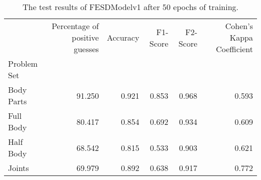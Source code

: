 \begin{table}
      \caption[]{}
      \label{}
          \begin{table}[!htbp]
        \caption[Test Results of FESDModelv1]{The test results of FESDModelv1 after 50 epochs of training.}
        \label{tab:res_v1}
        \begin{tabular}{lrrrrr}
\hline
{} &  Percentage of positive guesses &  Accuracy &  F1-Score &  F2-Score &  Cohen's Kappa Coefficient \\
Problem Set   &                                 &           &           &           &                            \\
\hline
Body Parts &                          91.250 &     0.921 &     0.853 &     0.968 &                      0.593 \\
Full Body  &                          80.417 &     0.854 &     0.692 &     0.934 &                      0.609 \\
Half Body  &                          68.542 &     0.815 &     0.533 &     0.903 &                      0.621 \\
Joints     &                          69.979 &     0.892 &     0.638 &     0.917 &                      0.772 \\
\hline
\end{tabular}

    \end{table}
  \end{table}